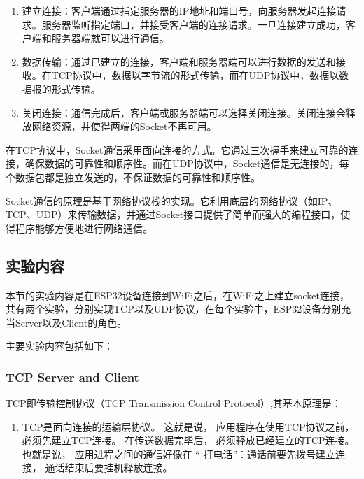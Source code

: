 \documentclass[a4paper,12pt,english]{sphinxmanual}
\begin{document}
{{\begin{enumerate}
\item {} 
\sphinxAtStartPar
建立连接：客户端通过指定服务器的IP地址和端口号，向服务器发起连接请求。服务器监听指定端口，并接受客户端的连接请求。一旦连接建立成功，客户端和服务器端就可以进行通信。

\item {} 
\sphinxAtStartPar
数据传输：通过已建立的连接，客户端和服务器端可以进行数据的发送和接收。在TCP协议中，数据以字节流的形式传输，而在UDP协议中，数据以数据报的形式传输。

\item {} 
\sphinxAtStartPar
关闭连接：通信完成后，客户端或服务器端可以选择关闭连接。关闭连接会释放网络资源，并使得两端的Socket不再可用。

\end{enumerate}

\sphinxAtStartPar
在TCP协议中，Socket通信采用面向连接的方式。它通过三次握手来建立可靠的连接，确保数据的可靠性和顺序性。而在UDP协议中，Socket通信是无连接的，每个数据包都是独立发送的，不保证数据的可靠性和顺序性。

\sphinxAtStartPar
Socket通信的原理是基于网络协议栈的实现。它利用底层的网络协议（如IP、TCP、UDP）来传输数据，并通过Socket接口提供了简单而强大的编程接口，使得程序能够方便地进行网络通信。


\subsection{实验内容}
\label{\detokenize{exp-esp32/socket/index:id2}}
\sphinxAtStartPar
本节的实验内容是在ESP32设备连接到WiFi之后，在WiFi之上建立socket连接，共有两个实验，分别实现TCP以及UDP协议，在每个实验中，ESP32设备分别充当Server以及Client的角色。

\sphinxAtStartPar
主要实验内容包括如下：

\sphinxstepscope


\subsubsection{TCP Server and Client}
\label{\detokenize{exp-esp32/socket/tcp:tcp-server-and-client}}\label{\detokenize{exp-esp32/socket/tcp::doc}}
\sphinxAtStartPar
TCP即传输控制协议（TCP Transmission Control Protocol）,其基本原理是：
\begin{enumerate}
%
\item {} 
\sphinxAtStartPar
TCP是面向连接的运输层协议。 这就是说， 应用程序在使用TCP协议之前， 必须先建立TCP连接。 在传送数据完毕后， 必须释放已经建立的TCP连接。 也就是说， 应用进程之间的通信好像在 “ 打电话”：通话前要先拨号建立连接， 通话结束后要挂机释放连接。


\end{enumerate}}}
\end{document}
